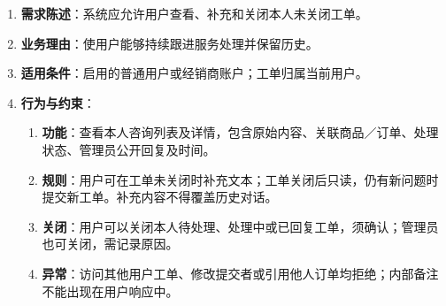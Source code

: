 \begin{enumerate}
\item {\bfseries 需求陈述}：系统应允许用户查看、补充和关闭本人未关闭工单。
\item {\bfseries 业务理由}：使用户能够持续跟进服务处理并保留历史。
\item {\bfseries 适用条件}：启用的普通用户或经销商账户；工单归属当前用户。
\item {\bfseries 行为与约束}：
\begin{enumerate}
\item {\bfseries 功能}：查看本人咨询列表及详情，包含原始内容、关联商品／订单、处理状态、管理员公开回复及时间。
\item {\bfseries 规则}：用户可在工单未关闭时补充文本；工单关闭后只读，仍有新问题时提交新工单。补充内容不得覆盖历史对话。
\item {\bfseries 关闭}：用户可以关闭本人待处理、处理中或已回复工单，须确认；管理员也可关闭，需记录原因。
\item {\bfseries 异常}：访问其他用户工单、修改提交者或引用他人订单均拒绝；内部备注不能出现在用户响应中。
\end{enumerate}

\end{enumerate}


